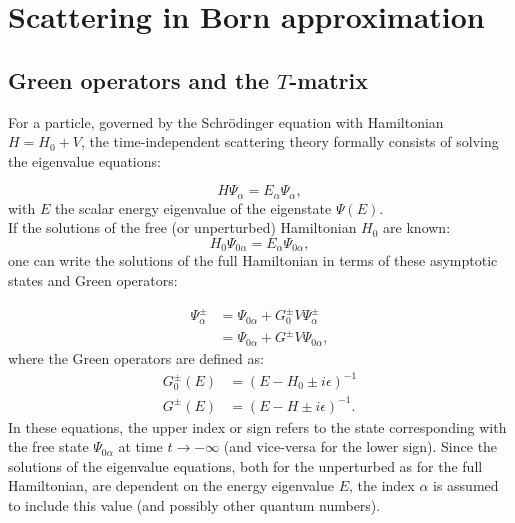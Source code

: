 


\section{Scattering in Born approximation}


\subsection{Green operators and the $T$-matrix}
  \label{sec:BornT}

For a particle, governed by the Schr\"odinger equation with Hamiltonian $H = H_0 + V$, the time-independent scattering theory formally consists of solving the eigenvalue equations:

\begin{equation*}
  H\Psi_\alpha = E_\alpha\Psi_\alpha,
\end{equation*}
with $E$ the scalar energy eigenvalue of the eigenstate $\Psi(E)$.\\
If the solutions of the free (or unperturbed) Hamiltonian $H_0$ are known:
\begin{equation*}
  H_0\Psi_{0\alpha} = E_\alpha\Psi_{0\alpha},
\end{equation*}
one can write the solutions of the full Hamiltonian in terms of these asymptotic states and Green operators:

\begin{align*}
  \Psi^\pm_\alpha &= \Psi_{0\alpha} + G^\pm_0 V \Psi^\pm_\alpha  \\
  & = \Psi_{0\alpha} + G^\pm V  \Psi_{0\alpha},
\end{align*}
where the Green operators are defined as:
\begin{align*}
  G^\pm_0(E) &= (E-H_0\pm i\epsilon )^{-1}  \\
  G^\pm (E) &= (E-H\pm i\epsilon )^{-1}.
\end{align*}
In these equations, the upper index or sign refers to the state corresponding with the free state $\Psi_{0\alpha}$ at time $t\rightarrow - \infty$ (and vice-versa for the lower sign). Since the solutions of the eigenvalue equations, both for the unperturbed as for the full Hamiltonian, are dependent on the energy eigenvalue $E$, the index $\alpha$ is assumed to include this value (and possibly other quantum numbers).

